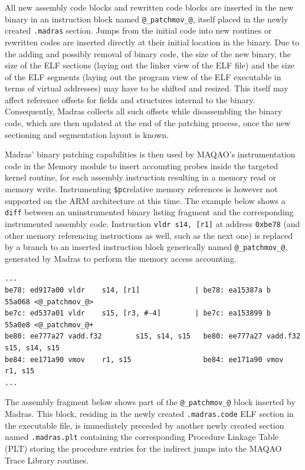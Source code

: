 \documentclass[11pt, a4paper, twoside]{montblanc2}
\begin{document}
All new assembly code blocks and rewritten code blocks are inserted in the new 
binary in an instruction block named \verb|@_patchmov_@|, itself placed in the 
newly created \verb|.madras| section. Jumps from the initial code into new 
routines or rewritten codes are inserted directly at their initial location in 
the binary. Due to the adding and possibly removal of binary code, the size of 
the new binary, the size of the ELF sections (laying out the linker view of the 
ELF file) and the size of the ELF segments (laying out the program view of the 
ELF executable in terms of virtual addresses) may have to be shifted and 
resized. This itself may affect reference offsets for fields and structures 
internal to the binary. Consequently, Madras collects all such offsets while 
disassembling the binary code, which are then updated at the end of the patching 
process, once the new sectioning and segmentation layout is known.

Madras' binary patching capabilities is then used by MAQAO's instrumentation 
code in the Memory module to insert accounting probes inside the targeted kernel 
routine, for each assembly instruction resulting in a memory read or memory 
write. Instrumenting \verb|$pc|relative memory references is however not 
supported on the ARM architecture at this time. The example below shows a \verb|diff| 
between an uninstrumented binary listing fragment and the corresponding 
instrumented assembly code. Instruction \verb|vldr s14, [r1]| at address 
\texttt{0xbe78} (and other memory referencing instructions as well, such as the 
next one) is replaced by a branch to an inserted instruction block generically 
named \verb|@_patchmov_@|, generated by Madras to perform the memory access 
accounting.
\begin{footnotesize}
\begin{verbatim}
...
be78: ed917a00 vldr    s14, [r1]             | be78: ea15387a b       55a068 <@_patchmov_@>
be7c: ed537a01 vldr    s15, [r3, #-4]        | be7c: ea153899 b       55a0e8 <@_patchmov_@+
be80: ee777a27 vadd.f32        s15, s14, s15   be80: ee777a27 vadd.f32        s15, s14, s15
be84: ee171a90 vmov    r1, s15                 be84: ee171a90 vmov    r1, s15
...
\end{verbatim}
\end{footnotesize}

The assembly fragment below shows part of the \verb|@_patchmov_@| block inserted 
by Madras. This block, residing in the newly created \texttt{.madras.code} ELF 
section in the executable file, is immediately preceded by another newly created 
section named \texttt{.madras.plt} containing the corresponding Procedure 
Linkage Table (PLT) storing the procedure entries for the indirect jumps into 
the MAQAO Trace Library routines.
\end{document}
